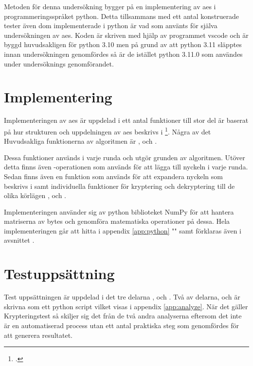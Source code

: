 Metoden för denna undersökning bygger på en implementering av \acrshort{aes} i programmeringsspråket
\gls{python}. Detta tillsammans med ett antal konstruerade tester även dom implementerade i
\gls{python} är vad som använts för själva undersökningen av \acrshort{aes}. Koden
är skriven med hjälp av programmet \gls{vscode} och är byggd huvudsakligen för \gls{python} 3.10 men
på grund av att \gls{python} 3.11 släpptes innan undersökningen genomfördes så är de istället \gls{python} 3.11.0
som användes under undersöknings genomförandet.

\section{Implementering} %
Implementeringen av \acrshort{aes} är uppdelad i ett antal funktioner till stor del är baserat på
hur strukturen och uppdelningen av \acrshort{aes} beskrivs i \footcite{daemen1999aes}.
Några av det Huvudsakliga funktionerna av algoritmen är ,  och
.

Dessa funktioner används i varje runda och utgör grunden av algoritmen. Utöver detta finns
även -operationen som används för att lägga till nyckeln i varje runda. Sedan finns även
en funktion som används för att expandera nyckeln som beskrivs i  samt
individuella funktioner för kryptering och dekryptering till de olika körlägen ,  och
.

Implementeringen använder sig av \gls{python} biblioteket NumPy för att hantera matriserna av \gls{byte}s och genomföra
matematiska operationer på dessa. Hela implementeringen går att hitta i appendix \ref{app:python} "" samt
förklaras även i avsnittet .

\section{Testuppsättning} %
Test uppsättningen är uppdelad i det tre delarna ,  och . Två av delarna,  och
 är skrivna som ett \gls{python} script vilket visas i appendix \ref{app:analyze}. När det gäller Krypteringstest så skiljer sig det från de två andra analyserna eftersom det
inte är en automatiserad process utan ett antal praktiska steg som genomfördes för att generera resultatet.

